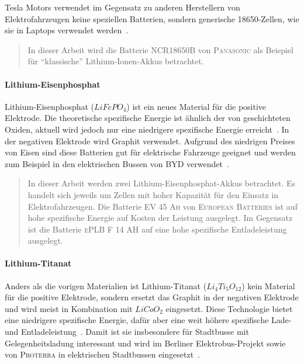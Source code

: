 Tesla Motors verwendet im Gegensatz zu anderen Herstellern von Elektrofahrzeugen keine speziellen Batterien, sondern generische 18650-Zellen, wie sie in Laptops verwendet werden~\cite{teslaBatReport}.

\begin{quote}
	In dieser Arbeit wird die Batterie \textsc{NCR18650B} von \textsc{Panasonic} als Beispiel für "`klassische"' Lithium-Ionen-Akkus betrachtet.
\end{quote}

\paragraph{Lithium-Eisenphosphat}
Lithium-Eisenphosphat ($LiFePO_4$) ist ein neues Material für die positive Elektrode. Die theoretische spezifische Energie ist ähnlich der von geschichteten Oxiden, aktuell wird jedoch nur eine niedrigere spezifische Energie erreicht~\cite{Tie201382}. In der negativen Elektrode wird Graphit verwendet. Aufgrund des niedrigen Preises von Eisen sind diese Batterien gut für elektrische Fahrzeuge geeignet und werden zum Beispiel in den elektrischen Bussen von \textsc{BYD} verwendet~\cite{bydSpecs}.

\begin{quote}
	In dieser Arbeit werden zwei Lithium-Eisenphosphat-Akkus betrachtet. Es handelt sich jeweils um Zellen mit hoher Kapazität für den Einsatz in Elektrofahrzeugen. Die Batterie \textsc{EV 45 Ah} von \textsc{European Batteries} ist auf hohe spezifische Energie auf Kosten der Leistung ausgelegt. Im Gegensatz ist die Batterie \textsc{ePLB F 14 AH} auf eine hohe spezifische Entladeleistung ausgelegt.
\end{quote}

\paragraph{Lithium-Titanat}
Anders als die vorigen Materialien ist Lithium-Titanat ($Li_4Ti_5O_{12}$) kein Material für die positive Elektrode, sondern ersetzt das Graphit in der negativen Elektrode und wird meist in Kombination mit $LiCoO_2$ eingesetzt. Diese Technologie bietet eine niedrigere spezifische Energie, dafür aber eine weit höhere spezifische Lade- und Entladeleistung~\cite{veneri2012charging}. Damit ist sie insbesondere für Stadtbusse mit Gelegenheitsladung interessant und wird im Berliner Elektrobus-Projekt sowie von \textsc{Proterra} in elektrischen Stadtbussen eingesetzt~\cite{protCat}.

